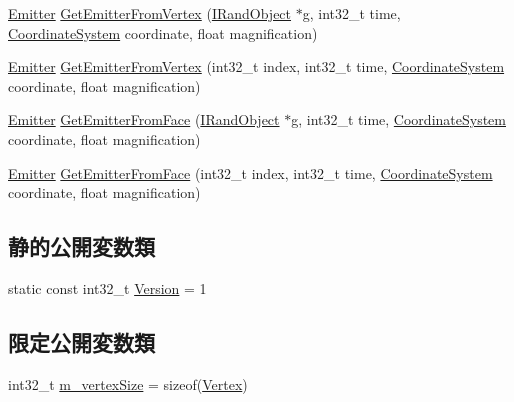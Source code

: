 \begin{DoxyCompactItemize}
\item 
\mbox{\hyperlink{struct_effekseer_1_1_model_1_1_emitter}{Emitter}} \mbox{\hyperlink{class_effekseer_1_1_model_a903c0b92208cebf971846956770fb681}{Get\+Emitter\+From\+Vertex}} (\mbox{\hyperlink{class_effekseer_1_1_i_rand_object}{I\+Rand\+Object}} $\ast$g, int32\+\_\+t time, \mbox{\hyperlink{namespace_effekseer_ac8508f8823c5fcf36aac5d2ddee23765}{Coordinate\+System}} coordinate, float magnification)
\item 
\mbox{\hyperlink{struct_effekseer_1_1_model_1_1_emitter}{Emitter}} \mbox{\hyperlink{class_effekseer_1_1_model_a0cdeb0635f63e2697bb82f74c8c40aef}{Get\+Emitter\+From\+Vertex}} (int32\+\_\+t index, int32\+\_\+t time, \mbox{\hyperlink{namespace_effekseer_ac8508f8823c5fcf36aac5d2ddee23765}{Coordinate\+System}} coordinate, float magnification)
\item 
\mbox{\hyperlink{struct_effekseer_1_1_model_1_1_emitter}{Emitter}} \mbox{\hyperlink{class_effekseer_1_1_model_aef7548be4adad150a7f573ac977d89c7}{Get\+Emitter\+From\+Face}} (\mbox{\hyperlink{class_effekseer_1_1_i_rand_object}{I\+Rand\+Object}} $\ast$g, int32\+\_\+t time, \mbox{\hyperlink{namespace_effekseer_ac8508f8823c5fcf36aac5d2ddee23765}{Coordinate\+System}} coordinate, float magnification)
\item 
\mbox{\hyperlink{struct_effekseer_1_1_model_1_1_emitter}{Emitter}} \mbox{\hyperlink{class_effekseer_1_1_model_a1bd509af3054aeee73aaf495732e3f4a}{Get\+Emitter\+From\+Face}} (int32\+\_\+t index, int32\+\_\+t time, \mbox{\hyperlink{namespace_effekseer_ac8508f8823c5fcf36aac5d2ddee23765}{Coordinate\+System}} coordinate, float magnification)
\end{DoxyCompactItemize}
\subsection*{静的公開変数類}
\begin{DoxyCompactItemize}
\item 
static const int32\+\_\+t \mbox{\hyperlink{class_effekseer_1_1_model_a9f5c2f10fde65efeb5bc603ed9d6436e}{Version}} = 1
\end{DoxyCompactItemize}
\subsection*{限定公開変数類}
\begin{DoxyCompactItemize}
\item 
int32\+\_\+t \mbox{\hyperlink{class_effekseer_1_1_model_a94c5608140d79abf8280b67df12a6060}{m\+\_\+vertex\+Size}} = sizeof(\mbox{\hyperlink{struct_effekseer_1_1_model_1_1_vertex}{Vertex}})
\end{DoxyCompactItemize}



